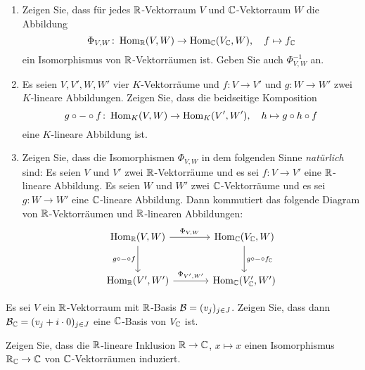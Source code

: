 \documentclass[a4paper,10pt]{scrartcl}
\begin{document}
\begin{question}
  \begin{enumerate}[leftmargin=*]
    \item
      Zeigen Sie, dass für jedes $\mathbb{R}$-Vektorraum $V$ und $\mathbb{C}$-Vektorraum $W$ die Abbildung
      \[
        \Phi_{V,W} \colon \operatorname{Hom}_{\mathbb{R}}(V, W) \to \operatorname{Hom}_{\mathbb{C}}(V_{\mathbb{C}}, W),
        \quad
        f \mapsto f_{\mathbb{C}}
      \]
      ein Isomorphismus von $\mathbb{R}$-Vektorräumen ist.
      Geben Sie auch $\Phi_{V,W}^{-1}$ an.
    \item
      Es seien  $V, V', W, W'$ vier $K$-Vektorräume und $f \colon V \to V'$ und $g \colon W \to W'$ zwei $K$-lineare Abbildungen.
      Zeigen Sie, dass die beidseitige Komposition
      \[
        g \circ - \circ f
        \colon
        \operatorname{Hom}_K(V, W) \to \operatorname{Hom}_K(V', W'),
        \quad
        h \mapsto g \circ h \circ f
      \]
      eine $K$-lineare Abbildung ist.
    \item
      Zeigen Sie, dass die Isomorphismen $\Phi_{V,W}$ in dem folgenden Sinne \emph{natürlich} sind:
      Es seien $V$ und $V'$ zwei $\mathbb{R}$-Vektorräume und es sei $f \colon V \to V'$ eine $\mathbb{R}$-lineare Abbildung.
      Es seien $W$ und $W'$ zwei $\mathbb{C}$-Vektorräume und es sei $g \colon W \to W'$ eine $\mathbb{C}$-lineare Abbildung.
      Dann kommutiert das folgende Diagram von $\mathbb{R}$-Vektorräumen und $\mathbb{R}$-linearen Abbildungen:
      \[
        \begin{tikzcd}[row sep = large, column sep = large, ampersand replacement=\&]
                \Hom_\Rbb(V, W)         \arrow[swap]{d}{g \circ - \circ f}
                                        \arrow{r}{\Phi_{V,W}}
            \&  \Hom_\Cbb(V_\Cbb, W)    \arrow{d}{g \circ - \circ f_\Cbb}
          \\
                \Hom_\Rbb(V', W')       \arrow{r}{\Phi_{V',W'}}
            \&  \Hom_\Cbb(V'_\Cbb, W')
        \end{tikzcd}
      \]

  \end{enumerate}
\end{question}


\begin{question}
  Es sei $V$ ein $\mathbb{R}$-Vektorraum mit $\mathbb{R}$-Basis $\mathcal{B} = (v_j)_{j \in J}$.
  Zeigen Sie, dass dann $\mathcal{B}_{\mathbb{C}} = (v_j + i \cdot 0)_{j \in J}$ eine $\mathbb{C}$-Basis von $V_{\mathbb{C}}$ ist.
\end{question}



\begin{question}
  Zeigen Sie, dass die $\mathbb{R}$-lineare Inklusion $\mathbb{R} \to \mathbb{C}$, $x \mapsto x$ einen Isomorphismus $\mathbb{R}_{\mathbb{C}} \to \mathbb{C}$ von $\mathbb{C}$-Vektorräumen induziert.
\end{question}
\end{document}
